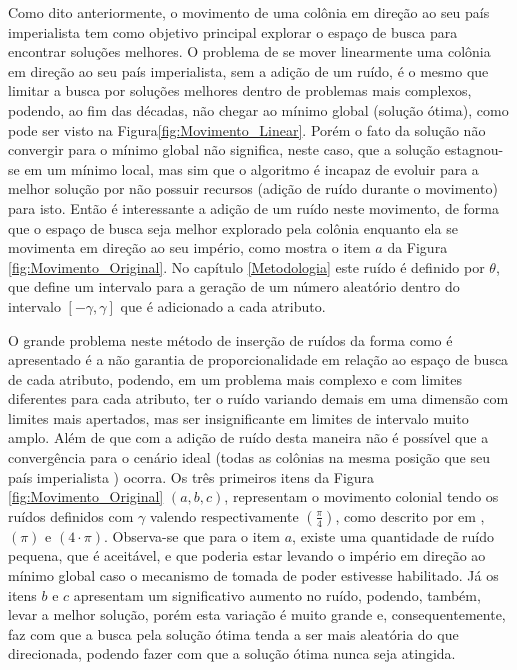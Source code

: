 Como dito anteriormente, o movimento de uma colônia em direção ao seu país imperialista tem como objetivo principal explorar o espaço de busca para encontrar soluções melhores. O problema de se mover linearmente uma colônia em direção ao seu país imperialista, sem a adição de um ruído, é o mesmo que limitar a busca por soluções melhores dentro de problemas mais complexos, podendo, ao fim das décadas, não chegar ao mínimo global (solução ótima), como pode ser visto na Figura\ref{fig:Movimento_Linear}. Porém o fato da solução não convergir para o mínimo global não significa, neste caso, que a solução estagnou-se em um mínimo local, mas sim que o algoritmo é incapaz de evoluir para a melhor solução por não possuir recursos (adição de ruído durante o movimento) para isto. Então é interessante a adição de um ruído neste movimento, de forma que o espaço de busca seja melhor explorado pela colônia enquanto ela se movimenta em direção ao seu império, como mostra o item \(a\) da Figura \ref{fig:Movimento_Original}. No capítulo \ref{Metodologia} este ruído é definido por \(\theta\), que define um intervalo para a geração de um número aleatório dentro do intervalo \( \left[ -\gamma,\gamma \right]\) que é adicionado a cada atributo. 

O grande problema neste método de inserção de ruídos da forma como é apresentado é a não garantia de proporcionalidade em relação ao espaço de busca de cada atributo, podendo, em um problema mais complexo e com limites diferentes para cada atributo, ter o ruído variando demais em uma dimensão com limites mais apertados, mas ser insignificante em limites de intervalo muito amplo. Além de que com a adição de ruído desta maneira não é possível que a convergência para o cenário ideal (todas as colônias na mesma posição que seu país imperialista ) ocorra.  Os três primeiros itens da Figura \ref{fig:Movimento_Original} \((a, b, c)\), representam o movimento colonial tendo os ruídos definidos com \(\gamma\) valendo respectivamente \(\left(\frac{\pi}{4}\right)\), como descrito por \citeauthor{atashpaz2007imperialist} em \cite{atashpaz2007imperialist}, \(\left(\pi\right)\) e \(\left(4\cdot \pi\right)\). Observa-se que para o item \(a\), existe uma quantidade de ruído pequena, que é aceitável, e que poderia estar levando o império em direção ao mínimo global caso o mecanismo de tomada de poder estivesse habilitado. Já os itens \(b\) e \(c\) apresentam um significativo aumento no ruído, podendo, também, levar a melhor solução, porém esta variação é muito grande e, consequentemente, faz com que a busca pela solução ótima tenda a ser mais aleatória do que direcionada, podendo fazer com que a solução ótima nunca seja atingida.  

